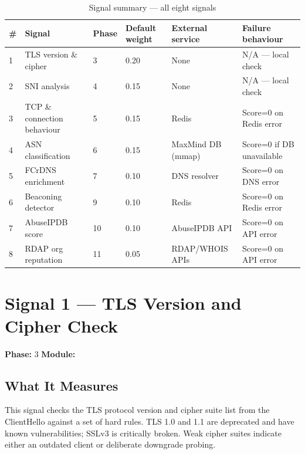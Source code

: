 \begin{fullwidth}
\begin{table}[h]
\caption{Signal summary — all eight signals}
\label{tab:signal-summary}
\begin{tabular}{@{}lllllp{4cm}@{}}
\toprule
\textbf{\#} & \textbf{Signal} & \textbf{Phase} & \textbf{Default weight} & \textbf{External service} & \textbf{Failure behaviour} \\
\midrule
1 & TLS version \& cipher & 3 & 0.20 & None & N/A — local check \\
2 & SNI analysis & 4 & 0.15 & None & N/A — local check \\
3 & TCP \& connection behaviour & 5 & 0.15 & Redis & Score=0 on Redis error \\
4 & ASN classification & 6 & 0.15 & MaxMind DB (mmap) & Score=0 if DB unavailable \\
5 & FCrDNS enrichment & 7 & 0.10 & DNS resolver & Score=0 on DNS error \\
6 & Beaconing detector & 9 & 0.10 & Redis & Score=0 on Redis error \\
7 & AbuseIPDB score & 10 & 0.10 & AbuseIPDB API & Score=0 on API error \\
8 & RDAP org reputation & 11 & 0.05 & RDAP/WHOIS APIs & Score=0 on API error \\
\bottomrule
\end{tabular}
\end{table}
\end{fullwidth}

\section{Signal 1 — TLS Version and Cipher Check}
\label{sig:tls}

\textbf{Phase:} 3 \quad \textbf{Module:} 

\subsection{What It Measures}

This signal checks the TLS protocol version and cipher suite list from the ClientHello
against a set of hard rules. TLS 1.0 and 1.1 are deprecated and have known
vulnerabilities; SSLv3 is critically broken. Weak cipher suites indicate either an
outdated client or deliberate downgrade probing.

